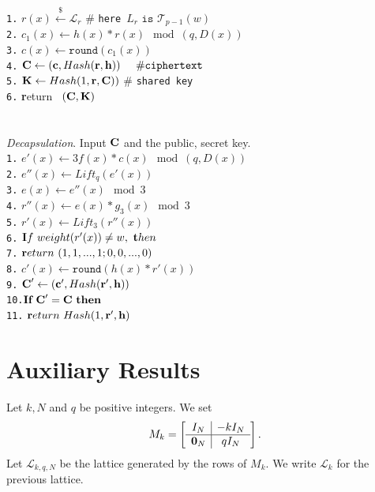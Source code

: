 \documentclass{amsart}
\numberwithin{equation}{section}
\begin{document}
\texttt{1.}  $r(x)\xleftarrow{\$} {\mathcal{L}}_r$ \hspace{10pt} \# {\texttt{here}}\ $L_r \texttt{ is } {\mathcal{T}}_{p-1}(w)$\\
\texttt{2.} $c_1(x)\leftarrow h(x)*r(x)\mod{(q,D(x))}$ \\
\texttt{3.} $c(x)\leftarrow {\texttt{round}}(c_1(x))$\\
\texttt{4.} ${\textbf C}\leftarrow ({\textbf c},Hash({\textbf r},{\textbf h}))\hspace{14pt} \# {\texttt{ciphertext}}$\\
\texttt{5.}  ${\textbf K}\leftarrow Hash(1,{\textbf r},{\textbf C}))  $ \hspace{10pt} \# {\texttt{shared key}}\\
\texttt{6.}  {\textbf return} \ $({\textbf C},{\textbf K})$\\
\ \\\\
{\it Decapsulation}. Input ${\textbf C}$ and the public, secret key.
\ \\
\texttt{1.}  $e'(x)\leftarrow 3f(x)*c(x)\mod{(q,D(x))}$ \\
\texttt{2.}  $e''(x)\leftarrow Lift_q(e'(x))$\\
\texttt{3.}  $e(x)\leftarrow e''(x)\mod{3}$\\
\texttt{4.}  $r''(x) \leftarrow e(x)*g_3(x) \mod{3}$ \\
\texttt{5.}  $r'(x) \leftarrow Lift_3(r''(x))$  \\
\texttt{6.}  ${\textbf If}\ weight(r'(x))\not=w, \ {\textbf then}$\\ 
\texttt{7.} \hspace{10pt} ${\textbf return} \ (1,1,...,1;0,0,...,0)$\\ 
\texttt{8.} $c'(x) \leftarrow {\texttt{round}}(h(x)*r'(x))$\\ 
\texttt{9.}  ${\textbf C}'\leftarrow ({\textbf c}',Hash({\textbf r}',{\textbf h}))$\\
\texttt{10.}${\textbf{If}}\ {\textbf C}'={\textbf C}\ {\textbf{then}}$ \\
\texttt{11.} \hspace{9pt} ${\textbf return}\ Hash(1,{\textbf r}',{\textbf h})$
\section{Auxiliary Results}\label{sec:Auxiliary}
	Let $k, N$ and $q$ be positive integers.	
We set 	
	$$M_k=
		\left[\begin{array}{c|c}
		I_N & -kI_N  \\
		\hline
		{\textbf 0}_N & qI_N   \\
		\end{array}\right].
		$$ 
Let ${\mathcal{L}}_{k,q,N}$ be the lattice generated by the rows of $M_k.$ We write ${\mathcal{L}}_{k}$ for the previous lattice.
\end{document}
